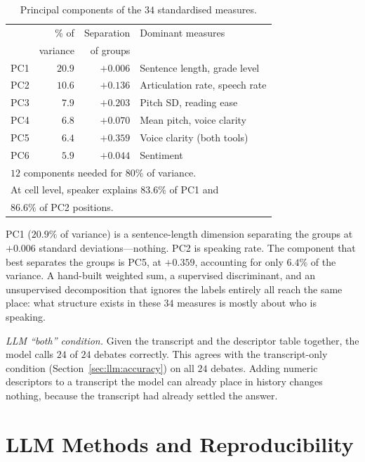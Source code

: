 \documentclass[pdflatex,sn-mathphys-num]{sn-jnl}%
\begin{document}
\begin{appendices}
\begin{table}[h]
\caption{Principal components of the $34$ standardised measures.}
\label{tab:pca}
\centering
\footnotesize
\setlength{\tabcolsep}{3pt}
\begin{tabular}{lrrl}
\toprule
 & \% of & Separation & Dominant measures \\
 & variance & of groups & \\
\midrule
PC1 & $20.9$ & $+0.006$ & Sentence length, grade level \\
PC2 & $10.6$ & $+0.136$ & Articulation rate, speech rate \\
PC3 & $7.9$  & $+0.203$ & Pitch SD, reading ease \\
PC4 & $6.8$  & $+0.070$ & Mean pitch, voice clarity \\
PC5 & $6.4$  & $+0.359$ & Voice clarity (both tools) \\
PC6 & $5.9$  & $+0.044$ & Sentiment \\
\midrule
\multicolumn{4}{l}{$12$ components needed for $80\%$ of variance.} \\
\multicolumn{4}{l}{At cell level, speaker explains $83.6\%$ of PC1 and} \\
\multicolumn{4}{l}{$86.6\%$ of PC2 positions.} \\
\bottomrule
\end{tabular}
\end{table}

PC1 ($20.9\%$ of variance) is a sentence-length dimension separating the
groups at $+0.006$ standard deviations---nothing. PC2 is speaking rate. The
component that best separates the groups is PC5, at $+0.359$, accounting for
only $6.4\%$ of the variance. A hand-built weighted sum, a supervised
discriminant, and an unsupervised decomposition that ignores the labels
entirely all reach the same place: what structure exists in these $34$
measures is mostly about who is speaking.

\emph{LLM ``both'' condition.} Given the transcript and the descriptor
table together, the model calls $24$ of $24$ debates correctly. This
agrees with the transcript-only condition (Section~\ref{sec:llm:accuracy})
on all $24$ debates. Adding numeric descriptors to a transcript the model
can already place in history changes nothing, because the transcript had
already settled the answer.

\section{LLM Methods and Reproducibility}
\label{app:llmrepro}


\end{appendices}
\end{document}
